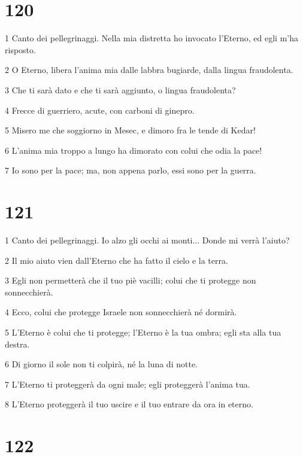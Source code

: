 \chapter{120}

\par 1 Canto dei pellegrinaggi. Nella mia distretta ho invocato l'Eterno, ed egli m'ha risposto.
\par 2 O Eterno, libera l'anima mia dalle labbra bugiarde, dalla lingua fraudolenta.
\par 3 Che ti sarà dato e che ti sarà aggiunto, o lingua fraudolenta?
\par 4 Frecce di guerriero, acute, con carboni di ginepro.
\par 5 Misero me che soggiorno in Mesec, e dimoro fra le tende di Kedar!
\par 6 L'anima mia troppo a lungo ha dimorato con colui che odia la pace!
\par 7 Io sono per la pace; ma, non appena parlo, essi sono per la guerra.

\chapter{121}

\par 1 Canto dei pellegrinaggi. Io alzo gli occhi ai monti... Donde mi verrà l'aiuto?
\par 2 Il mio aiuto vien dall'Eterno che ha fatto il cielo e la terra.
\par 3 Egli non permetterà che il tuo piè vacilli; colui che ti protegge non sonnecchierà.
\par 4 Ecco, colui che protegge Israele non sonnecchierà né dormirà.
\par 5 L'Eterno è colui che ti protegge; l'Eterno è la tua ombra; egli sta alla tua destra.
\par 6 Di giorno il sole non ti colpirà, né la luna di notte.
\par 7 L'Eterno ti proteggerà da ogni male; egli proteggerà l'anima tua.
\par 8 L'Eterno proteggerà il tuo uscire e il tuo entrare da ora in eterno.

\chapter{122}


